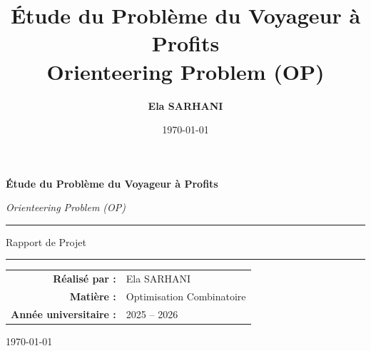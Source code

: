 \documentclass[11pt,a4paper]{article}
\title{
\vspace{-1cm}
\textbf{\Huge Étude du Problème du Voyageur à Profits}\\
\vspace{0.3cm}
\Large Orienteering Problem (OP)
}
\author{
\textbf{Ela SARHANI}
}
\date{\today}
\begin{document}
\begin{titlepage}

\begin{center}

\vspace*{2.5cm}


{\Huge\bfseries Étude du Problème du Voyageur à Profits \par}

\vspace{0.6cm}

{\LARGE\itshape Orienteering Problem (OP)\par}

\vspace{1.8cm}

\hrule
\vspace{0.5cm}
{\Large Rapport de Projet}
\vspace{0.5cm}
\hrule

\vspace{3cm}


\renewcommand{\arraystretch}{1.6}

\begin{tabular}{>{\bfseries}r l}
Réalisé par : & Ela SARHANI \\

Matière : & Optimisation Combinatoire \\

Année universitaire : & 2025 -- 2026 \\
\end{tabular}

\vfill


{\large \today\par}

\vspace{1cm}

\end{center}

\end{titlepage}

\end{document}

